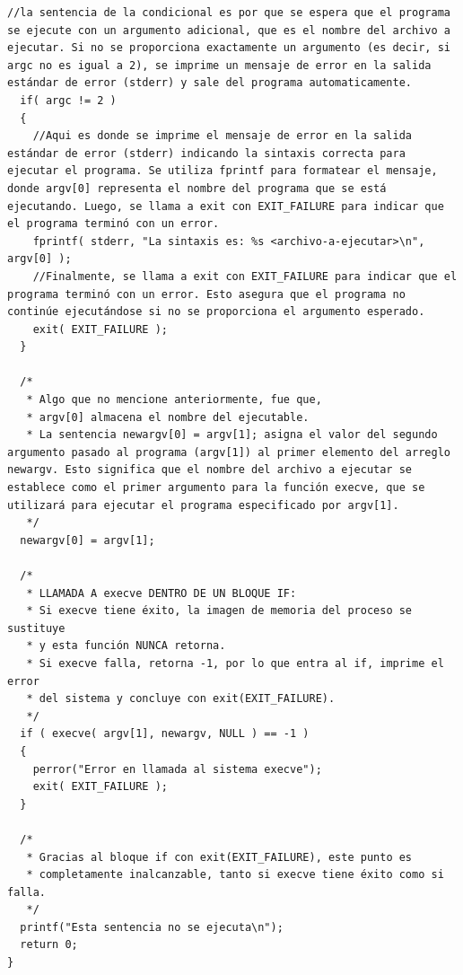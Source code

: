 \documentclass[letterpaper,11pt]{article}
\begin{document}
\begin{enumerate}[label=\alph*)]
\begin{lstlisting}[style=cstyle, caption={Programa 21\_execve.c comentado}, label={lst:programa21_execve_comentado}]
  //la sentencia de la condicional es por que se espera que el programa se ejecute con un argumento adicional, que es el nombre del archivo a ejecutar. Si no se proporciona exactamente un argumento (es decir, si argc no es igual a 2), se imprime un mensaje de error en la salida estándar de error (stderr) y sale del programa automaticamente.
  if( argc != 2 )
  {
    //Aqui es donde se imprime el mensaje de error en la salida estándar de error (stderr) indicando la sintaxis correcta para ejecutar el programa. Se utiliza fprintf para formatear el mensaje, donde argv[0] representa el nombre del programa que se está ejecutando. Luego, se llama a exit con EXIT_FAILURE para indicar que el programa terminó con un error.
    fprintf( stderr, "La sintaxis es: %s <archivo-a-ejecutar>\n", argv[0] );
    //Finalmente, se llama a exit con EXIT_FAILURE para indicar que el programa terminó con un error. Esto asegura que el programa no continúe ejecutándose si no se proporciona el argumento esperado.
    exit( EXIT_FAILURE );
  }

  /*
   * Algo que no mencione anteriormente, fue que, 
   * argv[0] almacena el nombre del ejecutable.
   * La sentencia newargv[0] = argv[1]; asigna el valor del segundo argumento pasado al programa (argv[1]) al primer elemento del arreglo newargv. Esto significa que el nombre del archivo a ejecutar se establece como el primer argumento para la función execve, que se utilizará para ejecutar el programa especificado por argv[1].
   */
  newargv[0] = argv[1];

  /*
   * LLAMADA A execve DENTRO DE UN BLOQUE IF:
   * Si execve tiene éxito, la imagen de memoria del proceso se sustituye
   * y esta función NUNCA retorna.
   * Si execve falla, retorna -1, por lo que entra al if, imprime el error
   * del sistema y concluye con exit(EXIT_FAILURE).
   */
  if ( execve( argv[1], newargv, NULL ) == -1 )
  {
    perror("Error en llamada al sistema execve");
    exit( EXIT_FAILURE );
  }

  /*
   * Gracias al bloque if con exit(EXIT_FAILURE), este punto es
   * completamente inalcanzable, tanto si execve tiene éxito como si falla.
   */
  printf("Esta sentencia no se ejecuta\n");
  return 0;
}
  \end{lstlisting}


\end{enumerate}
\end{document}
